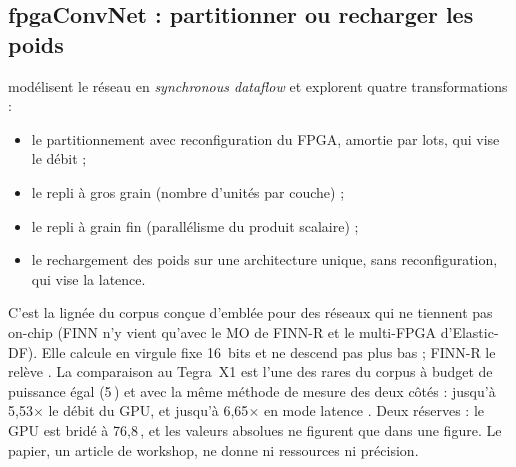 \subsection{fpgaConvNet : partitionner ou recharger les poids}

\citet{arxiv-1711.08740-fpgaconvnet-toolflow-mapping-diverse-convolutional} modélisent le
réseau en \emph{synchronous dataflow} et explorent quatre transformations
 :
\begin{itemize}
  \item le partitionnement avec reconfiguration du FPGA, amortie par lots, qui vise le
    débit ;
  \item le repli à gros grain (nombre d'unités par couche) ;
  \item le repli à grain fin (parallélisme du produit scalaire) ;
  \item le rechargement des poids sur une architecture unique, sans reconfiguration, qui
    vise la latence.
\end{itemize}
C'est la lignée du corpus conçue d'emblée pour des réseaux qui ne tiennent pas on-chip
(FINN n'y vient qu'avec le MO de FINN-R et le multi-FPGA d'Elastic-DF). Elle
calcule en virgule fixe 16~bits et ne descend pas plus bas ; FINN-R le relève
\citep[§2.2]{arxiv-1809.04570-finn-r-end-end-deep}. La comparaison au Tegra~X1 est l'une
des rares du corpus à budget de puissance égal (5\,) et avec la même méthode de mesure
des deux côtés : jusqu'à 5,53$\times$ le débit du GPU, et jusqu'à 6,65$\times$ en mode
latence . Deux réserves : le GPU est bridé à 76,8\,, et les valeurs absolues
ne figurent que dans une figure. Le papier, un article de workshop, ne donne ni
ressources ni précision.

